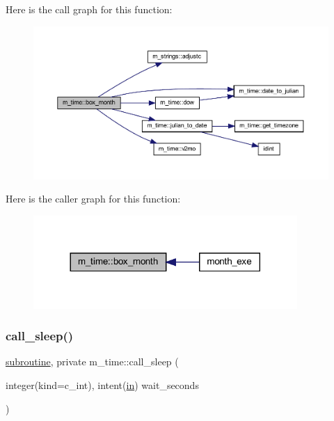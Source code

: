 Here is the call graph for this function\+:
\nopagebreak
\begin{figure}[H]
\begin{center}
\leavevmode
\includegraphics[width=350pt]{namespacem__time_a0fe7540912df30d3578f3c469413aea8_cgraph}
\end{center}
\end{figure}
Here is the caller graph for this function\+:
\nopagebreak
\begin{figure}[H]
\begin{center}
\leavevmode
\includegraphics[width=284pt]{namespacem__time_a0fe7540912df30d3578f3c469413aea8_icgraph}
\end{center}
\end{figure}
\mbox{\label{namespacem__time_af558bfc1fd5b13a6b879b3969866956f}} 
\subsubsection{\texorpdfstring{call\+\_\+sleep()}{call\_sleep()}}
{\footnotesize\ttfamily \hyperlink{M__stopwatch_83_8txt_acfbcff50169d691ff02d4a123ed70482}{subroutine}, private m\+\_\+time\+::call\+\_\+sleep (\begin{DoxyParamCaption}\item[{integer(kind=c\+\_\+int), intent(\hyperlink{M__journal_83_8txt_afce72651d1eed785a2132bee863b2f38}{in})}]{wait\+\_\+seconds }\end{DoxyParamCaption})\hspace{0.3cm}{\ttfamily [private]}}



